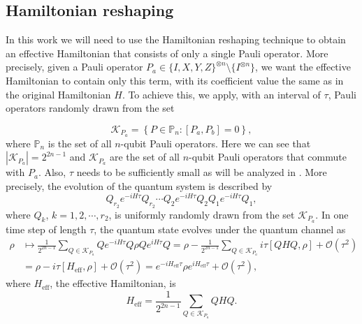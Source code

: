 \documentclass[twocolumn,superscriptaddress,aps,showpacs,amsmath,amstex,amssymb,citeautoscript,floatfix,pra,preprintnumbers]{revtex4-2}
\theoremstyle{plain}
\theoremstyle{plain}
\theoremstyle{plain}
\theoremstyle{plain}
\theoremstyle{plain}
\theoremstyle{plain}
\begin{document}
\begin{appendix}
\subsection{Hamiltonian reshaping}
\label{sec:app_Hamiltonian_reshaping}
In this work we will need to use the Hamiltonian reshaping technique to obtain an effective Hamiltonian that consists of only a single Pauli operator.
More precisely, given a Pauli operator $P_a\in\{I,X,Y,Z\}^{\otimes n}\setminus\{I^{\otimes n}\}$, we want the effective Hamiltonian to contain only this term, with its coefficient value the same as in the original Hamiltonian $H$. To achieve this, we apply, with an interval of $\tau$, Pauli operators randomly drawn from the set

\begin{equation}
    \label{eq:random_unitaries_ensemble}
    \mathcal{K}_{P_a} = \left\{P\in \mathbb{P}_n:[P_a,P_b]=0\right\},
\end{equation}
where $\mathbb{P}_n$ is the set of all $n$-qubit Pauli operators. Here we can see that $|\mathcal{K}_{P_a}| = 2^{2n-1}$ and $\mathcal{K}_{P_a}$ are the set of all $n$-qubit Pauli operators that commute with $P_a$.
Also, $\tau$ needs to be sufficiently small as will be analyzed in .
More precisely, the evolution of the quantum system is described by
\begin{equation}
    \label{eq:hamiltonian_reshaping}
    Q_{r_2} e^{-iH\tau}Q_{r_2}\cdots Q_2 e^{-iH\tau}Q_2Q_1 e^{-iH\tau}Q_1,
\end{equation}
where $Q_k$, $k=1,2,\cdots, r_2$, is uniformly randomly drawn from the set $\mathcal{K}_{P_a}$. In one time step of length $\tau$, the quantum state evolves under the quantum channel as
\begin{equation}
\begin{aligned}
    \rho &\mapsto \frac{1}{2^{2n-1}}\sum_{Q\in \mathcal{K}_{P_a}} Qe^{-iH\tau}Q\rho Qe^{iH\tau}Q 
    = \rho-\frac{1}{2^{2n-1}}\sum_{Q\in \mathcal{K}_{P_a}} i\tau [QHQ,\rho]+\mathcal{O}(\tau^2) \\
    &= \rho - i\tau [H_{\mathrm{eff}},\rho]+\mathcal{O}(\tau^2) 
    =e^{-iH_{\mathrm{eff}}\tau}\rho e^{iH_{\mathrm{eff}}\tau} + \mathcal{O}(\tau^2),
\end{aligned}
\end{equation}
where $H_{\mathrm{eff}}$, the effective Hamiltonian, is
\begin{equation}
    H_{\mathrm{eff}} = \frac{1}{2^{2n-1}}\sum_{Q\in \mathcal{K}_{P_a}} QHQ.
\end{equation}

\end{appendix}
\end{document}
